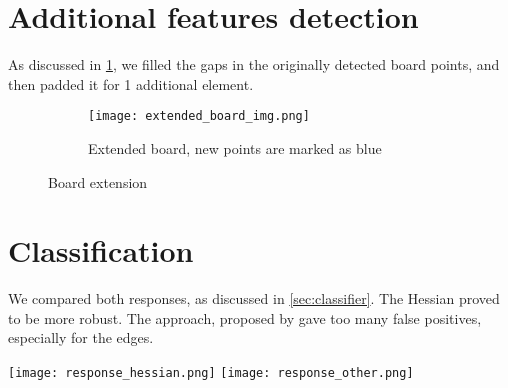 \section{Additional features detection}\label{sec:additional_features_detection}

As discussed in \cref{sec:additional_features_detection}, we filled the gaps in
the originally detected board points, and then padded it for 1 additional
element.

\begin{figure}[h]
	\centering
	\begin{minipage}{0.55\linewidth}
		\begin{subfigure}[b]{\linewidth}
			\texttt{[image: extended\_board\_img.png]}
			\label{fig:extended_board_img}
			\caption{Extended board, new points are marked as blue}
		\end{subfigure}
	\end{minipage}
	\begin{minipage}{0.35\linewidth}
		\vfill
	\end{minipage}
	\caption{Board extension}
\end{figure}

\section{Classification}\label{sec:classification}

\begin{minipage}[t]{0.3\linewidth}
	We compared both responses, as discussed in \cref{sec:classifier}.
	The Hessian proved to be more robust. The approach, proposed by
	\cite{geigerAutomaticCameraRange2012} gave too many false positives,
	especially for the edges.
\end{minipage}
\hfill
\begin{minipage}[t]{0.6\linewidth}
	\texttt{[image: response\_hessian.png]}
	\texttt{[image: response\_other.png]}
\end{minipage}

